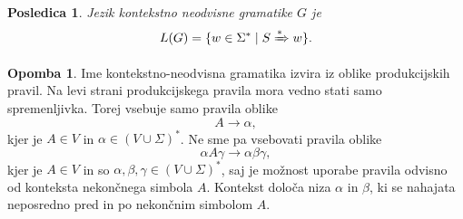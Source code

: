 \documentclass{amsart}
\theoremstyle{definition}
\newtheorem{opomba}[definicija]{Opomba}
\theoremstyle{plain} %
\newtheorem{posledica}[definicija]{Posledica}
\begin{document}
\begin{posledica}

    Jezik kontekstno neodvisne gramatike $ G $ je
    \[
        L(G) = \{ w \in \Sigma^* \mid S \xRightarrow{*} w \}.
    \]

\end{posledica}

\begin{opomba}
    
    Ime kontekstno-neodvisna gramatika izvira iz oblike produkcijskih pravil. Na levi
    strani produkcijskega pravila mora vedno stati samo spremenljivka. Torej vsebuje samo
    pravila oblike
    \[
        A \rightarrow \alpha,
    \]
    kjer je  $ A \in V $ in $ \alpha \in ( V \cup \Sigma )^* $. Ne sme pa vsebovati
    pravila oblike
    \[
        \alpha A \gamma \rightarrow \alpha\beta\gamma,
    \]
    kjer je $ A \in V $ in so $ \alpha, \beta, \gamma \in ( V \cup \Sigma )^* $, saj je možnost uporabe
    pravila odvisno od konteksta nekončnega simbola $ A $. Kontekst določa niza $ \alpha $ in $ \beta $,
    ki se nahajata neposredno pred in po nekončnim simbolom $ A $.

\end{opomba}
\end{document}
